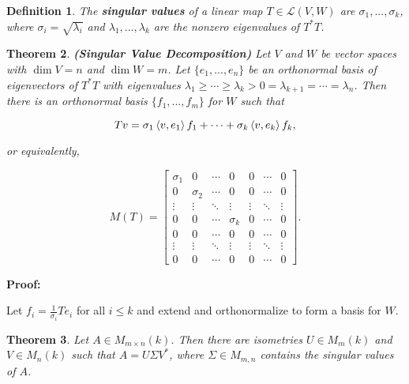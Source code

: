 \documentclass{article}
\theoremstyle{colontheorem}
\newtheorem{theorem}{Theorem}[section]
\newtheorem{definition}[theorem]{Definition}
\newenvironment{Theorem}
{
	\begin{mdframed}[backgroundcolor=TheoremOrange!10]
	\begin{theorem}
}
{
	\end{theorem}
	\end{mdframed}
	
	\vspace{.15in}
}
\newenvironment{Def}
{
	\begin{mdframed}[backgroundcolor=DefGreen!10]
	\begin{definition}
}
{
	\end{definition}
	\end{mdframed}
	
	\vspace{.15in}
}
\newenvironment{Proof}
{
	\vspace{-.3in}
	
	\begin{mdframed}[backgroundcolor=ProofPurple!10]
	\textbf{Proof:}%
}
{
	\end{mdframed}
	
	\vspace{.15in}
}
\begin{document}
\begin{Def}
	
	The \textbf{singular values} of a linear map $T \in \mathcal{L}(V, W)$ are $\sigma_1, ..., \sigma_k$, where $\sigma_i = \sqrt{\lambda_i}$ and $\lambda_1, ..., \lambda_k$ are the nonzero eigenvalues of $T^* T$.
	
\end{Def}



\begin{Theorem}
	
	\textbf{(Singular Value Decomposition)} Let $V$ and $W$ be vector spaces with $\dim V = n$ and $\dim W = m$. Let $\{e_1, ..., e_n\}$ be an orthonormal basis of eigenvectors of $T^* T$ with eigenvalues $\lambda_1 \geq \cdots \geq \lambda_k > 0 = \lambda_{k+1} = \cdots = \lambda_n$. Then there is an orthonormal basis $\{f_1, ..., f_m\}$ for $W$ such that
	
	$$
		Tv = \sigma_1 \left< v, e_1 \right> f_1 + \cdots + \sigma_k \left< v, e_k \right> f_k \textnormal{,}
	$$
	
	or equivalently,
	
	$$
		M(T) = \begin{bmatrix}
			\sigma_1 & 0 & \cdots & 0 & 0 & \cdots & 0\\
			0 & \sigma_2 & \cdots & 0 & 0 & \cdots & 0\\
			\vdots & \vdots & \ddots & \vdots & \vdots & \ddots & \vdots\\
			0 & 0 & \cdots & \sigma_k & 0 & \cdots & 0\\
			0 & 0 & \cdots & 0 & 0 & \cdots & 0\\
			\vdots & \vdots & \ddots & \vdots & \vdots & \ddots & \vdots\\
			0 & 0 & \cdots & 0 & 0 & \cdots & 0
		\end{bmatrix}.
	$$
	
\end{Theorem}



\begin{Proof}
	Let $f_i = \frac{1}{\sigma_i}Te_i$ for all $i \leq k$ and extend and orthonormalize to form a basis for $W$.
	
\end{Proof}



\begin{Theorem}
	
	Let $A \in M_{m \times n}(k)$. Then there are isometries $U \in M_m(k)$ and $V \in M_n(k)$ such that $A = U \Sigma V^*$, where $\Sigma \in M_{m, n}$ contains the singular values of $A$.
	
\end{Theorem}
\end{document}
